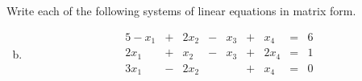 \documentclass[../main.tex]{subfiles}
\begin{document}
Write each of the following systems of linear equations in matrix form.
\begin{enumerate}[a)]
	\setcounter{enumi}{1}
	\item
		\begin{alignat*}{5}
			-x_1 & {}+{} & 2x_2 & {}-{} & x_3 & {}+{} &  x_4 & {}={} & 6 \\
			2x_1 & {}+{} &  x_2 & {}-{} & x_3 & {}+{} & 2x_4 & {}={} & 1 \\
			3x_1 & {}-{} & 2x_2 &       &     & {}+{} &  x_4 & {}={} & 0 \\
		\end{alignat*}
\end{enumerate}
\end{document}
